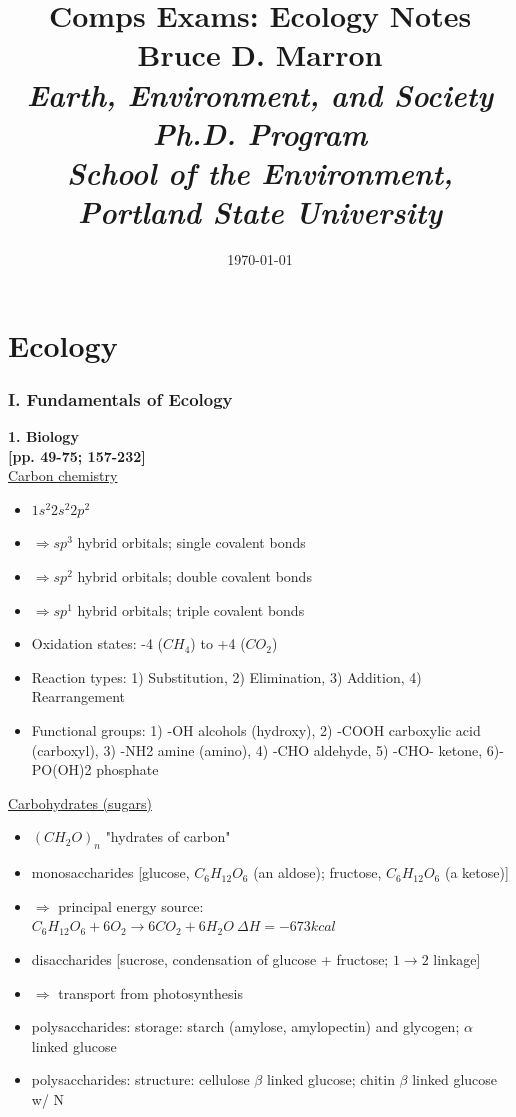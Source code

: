 \documentclass[12pt]{article}
\title{
\vspace{5mm}
\textmd{\textbf{Comps Exams: Ecology Notes}}\\
\normalsize {Bruce D. Marron}\\
\textit{\normalsize {Earth, Environment, and Society Ph.D. Program\\
School of the Environment, Portland State University}}\\
}
\date{\today}
\begin{document}
\maketitle
\thispagestyle{empty}
\clearpage\maketitle


\section{Ecology}

\subsubsection{I. Fundamentals of Ecology}
\textbf{ 1. Biology}\\
 \cite{curtis_biology_1983} \textbf{[pp. 49-75; 157-232]}\\
\underline{Carbon chemistry}
\begin{itemize}
	\item $1s^{2}2s^{2}2p^{2}$ 
	\item $\Rightarrow sp^{3}$ hybrid orbitals; single covalent bonds
	\item $\Rightarrow sp^{2}$ hybrid orbitals; double covalent bonds
	\item $\Rightarrow sp^{1}$ hybrid orbitals; triple covalent bonds
	\item Oxidation states: -4 ($CH_{4}$) to +4 ($CO_{2}$)
	\item Reaction types: 1) Substitution, 2) Elimination, 3) Addition, 4) Rearrangement
	\item Functional groups: 1) -OH alcohols (hydroxy), 2) -COOH carboxylic acid (carboxyl), 3) -NH2 amine (amino), 4) -CHO aldehyde, 5) -CHO- ketone, 6)-PO(OH)2 phosphate
\end{itemize}
\underline{Carbohydrates (sugars)}
\begin{itemize}
	\item $(CH_2O)_n$ "hydrates of carbon"
	\item monosaccharides [glucose, $C_6H_{12}O_6$ (an aldose); fructose, $C_6H_{12}O_6$ (a ketose)]
	\item $ \Rightarrow $ principal energy source: $C_6H_{12}O_6 + 6O_2 \rightarrow 6CO_2 + 6H_2O \ \Delta H = -673 kcal$
	\item disaccharides [sucrose, condensation of glucose + fructose; $1\rightarrow 2$ linkage]
	\item $ \Rightarrow $ transport from photosynthesis
	\item polysaccharides: storage: starch (amylose, amylopectin) and glycogen; $\alpha$ linked glucose
	\item polysaccharides: structure: cellulose $\beta $ linked glucose; chitin $\beta $ linked glucose w/ N
\end{itemize}
\end{document}

